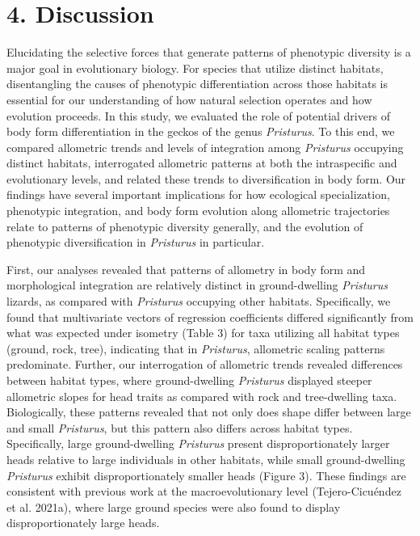\documentclass[
  11pt,
]{article}
\begin{document}
\hypertarget{discussion}{%
\section{4. Discussion}\label{discussion}}

Elucidating the selective forces that generate patterns of phenotypic
diversity is a major goal in evolutionary biology. For species that
utilize distinct habitats, disentangling the causes of phenotypic
differentiation across those habitats is essential for our understanding
of how natural selection operates and how evolution proceeds. In this
study, we evaluated the role of potential drivers of body form
differentiation in the geckos of the genus \emph{Pristurus}. To this
end, we compared allometric trends and levels of integration among
\emph{Pristurus} occupying distinct habitats, interrogated allometric
patterns at both the intraspecific and evolutionary levels, and related
these trends to diversification in body form. Our findings have several
important implications for how ecological specialization, phenotypic
integration, and body form evolution along allometric trajectories
relate to patterns of phenotypic diversity generally, and the evolution
of phenotypic diversification in \emph{Pristurus} in particular.
\hfill\break

First, our analyses revealed that patterns of allometry in body form and
morphological integration are relatively distinct in ground-dwelling
\emph{Pristurus} lizards, as compared with \emph{Pristurus} occupying
other habitats. Specifically, we found that multivariate vectors of
regression coefficients differed significantly from what was expected
under isometry (Table 3) for taxa utilizing all habitat types (ground,
rock, tree), indicating that in \emph{Pristurus}, allometric scaling
patterns predominate. Further, our interrogation of allometric trends
revealed differences between habitat types, where ground-dwelling
\emph{Pristurus} displayed steeper allometric slopes for head traits as
compared with rock and tree-dwelling taxa. Biologically, these patterns
revealed that not only does shape differ between large and small
\emph{Pristurus}, but this pattern also differs across habitat types.
Specifically, large ground-dwelling \emph{Pristurus} present
disproportionately larger heads relative to large individuals in other
habitats, while small ground-dwelling \emph{Pristurus} exhibit
disproportionately smaller heads (Figure 3). These findings are
consistent with previous work at the macroevolutionary level
(Tejero-Cicuéndez et al. 2021a), where large ground species were also
found to display disproportionately large heads. \hfill\break
\end{document}
